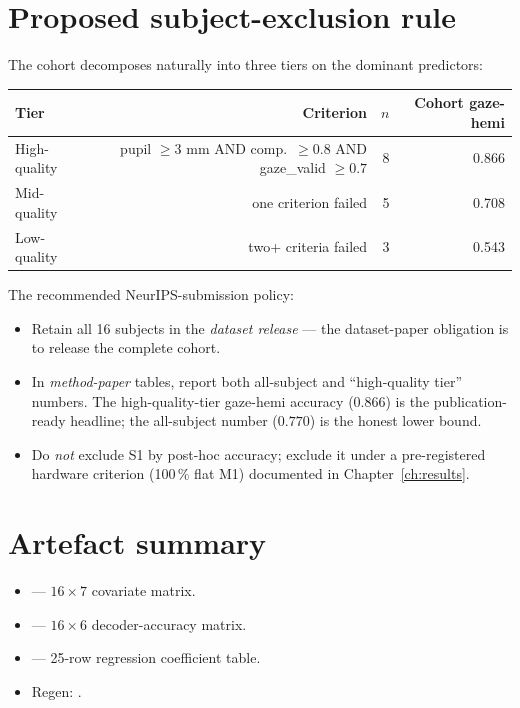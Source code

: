 \section{Proposed subject-exclusion rule}

The cohort decomposes naturally into three tiers on the dominant
predictors:

\begin{table}[ht]
\centering
\begin{tabular}{lrrr}
\toprule
Tier & Criterion & $n$ & Cohort gaze-hemi \\
\midrule
High-quality  & pupil $\geq 3$ mm AND comp.\ $\geq 0.8$ AND gaze\_valid $\geq 0.7$
              & 8  & 0.866 \\
Mid-quality   & one criterion failed
              & 5  & 0.708 \\
Low-quality   & two+ criteria failed
              & 3  & 0.543 \\
\bottomrule
\end{tabular}
\end{table}

\noindent
The recommended NeurIPS-submission policy:
\begin{itemize}
  \item Retain all 16 subjects in the \emph{dataset release} --- the
        dataset-paper obligation is to release the complete cohort.
  \item In \emph{method-paper} tables, report both all-subject and
        ``high-quality tier'' numbers. The high-quality-tier gaze-hemi
        accuracy ($0.866$) is the publication-ready headline; the
        all-subject number ($0.770$) is the honest lower bound.
  \item Do \emph{not} exclude S1 by post-hoc accuracy; exclude it under
        a pre-registered hardware criterion (100\,\% flat M1) documented
        in Chapter~\ref{ch:results}.
\end{itemize}

\section{Artefact summary}

\begin{itemize}
  \item {} --- $16
        \times 7$ covariate matrix.
  \item {} --- $16
        \times 6$ decoder-accuracy matrix.
  \item {} --- 25-row
        regression coefficient table.
  \item Regen: .
\end{itemize}
